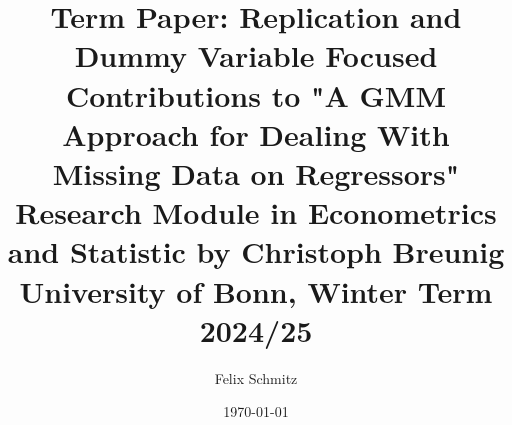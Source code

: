\documentclass[11pt, a4paper, leqno]{article}
\begin{document}
\title{Term Paper: Replication and Dummy Variable Focused Contributions to "A GMM Approach for Dealing With Missing Data on Regressors" \\
Research Module in Econometrics and Statistic by Christoph Breunig \\
University of Bonn, Winter Term 2024/25}

\author{Felix Schmitz\footnotemark[1]}

\date{
    \today
}

\maketitle
{}















\printbibliography
\end{document}
